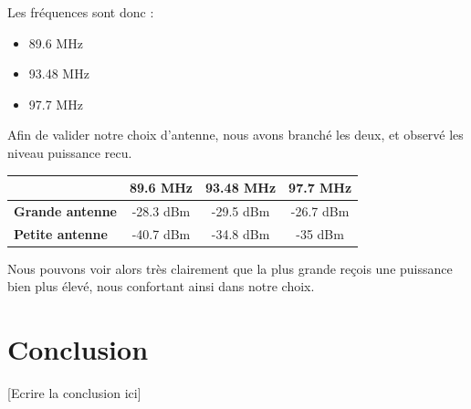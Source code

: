 \documentclass[a4paper,12pt]{report}            %
\begin{document}
Les fréquences sont donc :
\begin{itemize}
	\item 89.6 MHz
	\item 93.48 MHz
	\item 97.7 MHz
\end{itemize}

Afin de valider notre choix d'antenne, nous avons branché les deux, et observé les niveau puissance
recu.

\begin{center}
	\begin{tabular}{||p{4cm}||*{3}{c|}|}
		\hline
		\bfseries                & 89.6 MHz  & 93.48 MHz & 97.7 MHz  \\
		\hline
		\hline
		\bfseries Grande antenne & -28.3 dBm & -29.5 dBm & -26.7 dBm \\
		\hline
		\bfseries Petite antenne & -40.7 dBm & -34.8 dBm & -35 dBm   \\
		\hline
		\hline
	\end{tabular}
\end{center}

Nous pouvons voir alors très clairement que la plus grande reçois une puissance bien plus élevé,
nous confortant ainsi dans notre choix.

\chapter{Conclusion}

[Ecrire la conclusion ici]
\end{document}
